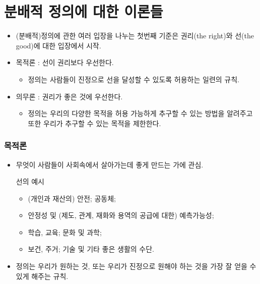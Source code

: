 \documentclass[aspectratio=169,xcolor=dvipsnames,handout]{beamer}
\begin{document}
\section{분배적 정의에 대한 이론들}
\begin{frame}[<+->]
    \begin{itemize}
       \item (분배적)정의에 관한 여러 입장을 나누는 첫번째 기준은 권리(the right)와 선(the good)에 대한 입장에서 시작.
       \item 목적론 : 선이 권리보다 우선한다.
        \begin{itemize}
           \item 정의는 사람들이 진정으로 선을 달성할 수 있도록 허용하는 일련의 규칙.
        \end{itemize}
       \item 의무론 : 권리가 좋은 것에 우선한다.
        \begin{itemize}
           \item 정의는 우리의 다양한 목적을 허용 가능하게 추구할 수 있는 방법을 알려주고 또한 우리가 추구할 수 있는 목적을 제한한다.
        \end{itemize}
    \end{itemize}
\end{frame}
   
\begin{frame}[<+->]
\frametitle{목적론}
    \begin{itemize}
        \item 무엇이 사람들이 사회속에서 살아가는데 좋게 만드는 가에 관심.
        \begin{exampleblock}{선의 예시}
        \begin{itemize}
            \item (개인과 재산의) 안전; 공동체; 
            \item 안정성 및 (제도, 관계, 재화와 용역의 공급에 대한) 예측가능성;
            \item 학습, 교육; 문화 및 과학;
            \item 보건, 주거; 기술 및 기타 좋은 생활의 수단.
        \end{itemize}
        \end{exampleblock}
        \item 정의는 우리가 원하는 것, 또는 우리가 진정으로 원해야 하는 것을 가장 잘 얻을 수 있게 해주는 규칙.
    \end{itemize}
\end{frame}
\end{document}
